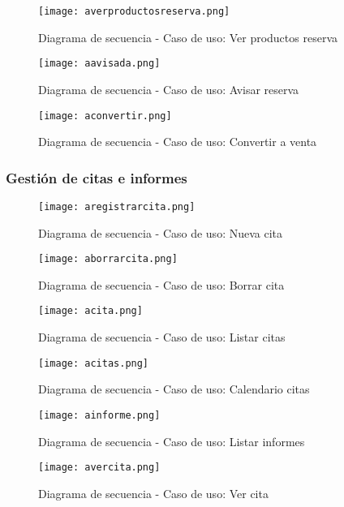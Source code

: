 \begin{figure}[!htb]
  \centering
    \texttt{[image: averproductosreserva.png]}
  \caption{Diagrama de secuencia - Caso de uso: Ver productos reserva  }
  \label{a}
\end{figure}

\begin{figure}[!htb]
  \centering
    \texttt{[image: aavisada.png]}
  \caption{Diagrama de secuencia - Caso de uso: Avisar reserva   }
  \label{a}
\end{figure}

\begin{figure}[!htb]
  \centering
    \texttt{[image: aconvertir.png]}
  \caption{Diagrama de secuencia - Caso de uso: Convertir a venta  }
  \label{a}
\end{figure}

\newpage
\subsubsection{Gestión de citas e informes}
\begin{figure}[!htb]
  \centering
    \texttt{[image: aregistrarcita.png]}
  \caption{Diagrama de secuencia - Caso de uso: Nueva cita }
  \label{a}
\end{figure}

\begin{figure}[!htb]
  \centering
    \texttt{[image: aborrarcita.png]}
  \caption{Diagrama de secuencia - Caso de uso: Borrar cita   }
  \label{a}
\end{figure}

\begin{figure}[!htb]
  \centering
    \texttt{[image: acita.png]}
  \caption{Diagrama de secuencia - Caso de uso: Listar citas   }
  \label{a}
\end{figure}

\begin{figure}[!htb]
  \centering
    \texttt{[image: acitas.png]}
  \caption{Diagrama de secuencia - Caso de uso: Calendario citas   }
  \label{a}
\end{figure}

\begin{figure}[!htb]
  \centering
    \texttt{[image: ainforme.png]}
  \caption{Diagrama de secuencia - Caso de uso: Listar informes   }
  \label{a}
\end{figure}

\begin{figure}[!htb]
  \centering
    \texttt{[image: avercita.png]}
  \caption{Diagrama de secuencia - Caso de uso: Ver cita   }
  \label{a}
\end{figure}

